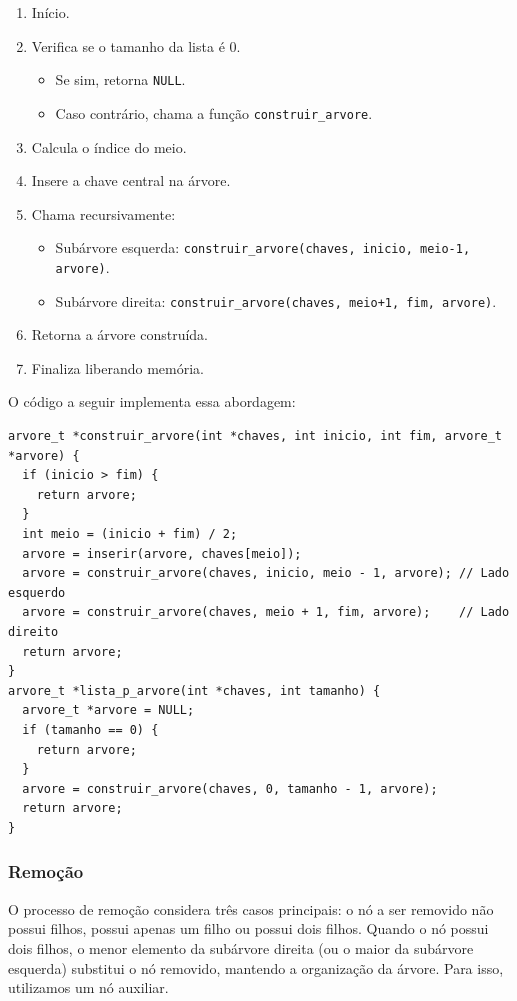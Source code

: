 \begin{enumerate}[label=\textbf{Etapa \arabic*:}]
    \item Início.
    \item Verifica se o tamanho da lista é 0.
          \begin{itemize}
              \item Se sim, retorna \texttt{NULL}.
              \item Caso contrário, chama a função \texttt{construir\_arvore}.
          \end{itemize}
    \item Calcula o índice do meio.
    \item Insere a chave central na árvore.
    \item Chama recursivamente:
          \begin{itemize}
              \item Subárvore esquerda: \texttt{construir\_arvore(chaves, inicio, meio-1, arvore)}.
              \item Subárvore direita: \texttt{construir\_arvore(chaves, meio+1, fim, arvore)}.
          \end{itemize}
    \item Retorna a árvore construída.
    \item Finaliza liberando memória.
\end{enumerate}

O código a seguir implementa essa abordagem:

\begin{lstlisting}
arvore_t *construir_arvore(int *chaves, int inicio, int fim, arvore_t *arvore) {
  if (inicio > fim) {
    return arvore;
  }
  int meio = (inicio + fim) / 2;
  arvore = inserir(arvore, chaves[meio]);
  arvore = construir_arvore(chaves, inicio, meio - 1, arvore); // Lado esquerdo
  arvore = construir_arvore(chaves, meio + 1, fim, arvore);    // Lado direito
  return arvore;
}
arvore_t *lista_p_arvore(int *chaves, int tamanho) {
  arvore_t *arvore = NULL;
  if (tamanho == 0) {
    return arvore;
  }
  arvore = construir_arvore(chaves, 0, tamanho - 1, arvore);
  return arvore;
}
\end{lstlisting}

\subsubsection{Remoção}

O processo de remoção considera três casos principais: o nó a ser removido não possui filhos, possui apenas um filho ou possui dois filhos. Quando o nó possui dois filhos, o menor elemento da subárvore direita (ou o maior da subárvore esquerda) substitui o nó removido, mantendo a organização da árvore. Para isso, utilizamos um nó auxiliar.


